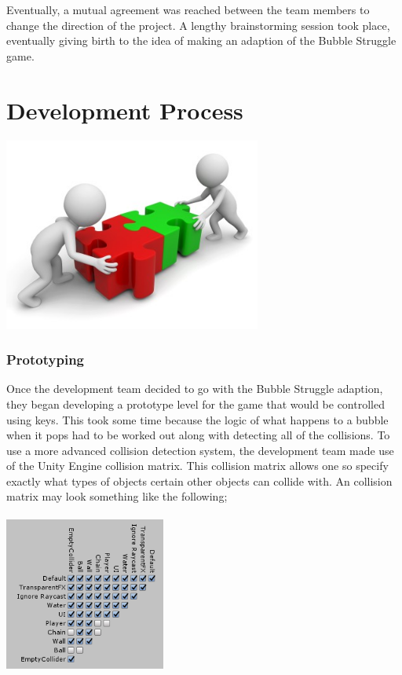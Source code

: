 \documentclass{article}
\begin{document}
\bigskip

Eventually, a mutual agreement was reached between the team members to change the direction of the project. A lengthy brainstorming session took place, eventually giving birth to the idea of making an adaption of the Bubble Struggle game.


\section{Development Process}
\includegraphics[width=\textwidth, height=180pt]{img/Development.jpg}

\bigskip

\subsubsection{Prototyping}
Once the development team decided to go with the Bubble Struggle adaption, they began developing a prototype level for the game that would be controlled using keys. This took some time because the logic of what happens to a bubble when it pops had to be worked out along with detecting all of the collisions. To use a more advanced collision detection system, the development team made use of the Unity Engine collision matrix. This collision matrix allows one so specify exactly what types of objects certain other objects can collide with. An collision matrix may look something like the following;
\bigskip

\includegraphics[width=150pt, height=150pt]{img/Matrix.PNG}
\end{document}
